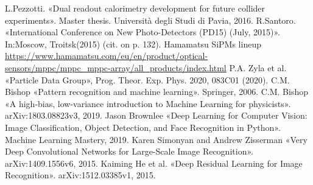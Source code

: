 \documentclass[a4paper,11pt,titlepage,oneside]{book}	%
\begin{document}
	\begin{backmatter}
		
		
		\begin{thebibliography}{99}
			
			
			 L.Pezzotti. «Dual readout calorimetry development for future collider experiments». Master thesis. Università degli Studi di Pavia, 2016.
			 R.Santoro. «International Conference on New Photo-Detectors (PD15) (July, 2015)». In:Moscow, Troitsk(2015) (cit. on p. 132).
			 Hamamatsu SiPMs lineup \url{https://www.hamamatsu.com/eu/en/product/optical-sensors/mppc/mppc_mppc-array/all_products/index.html}
			 P.A. Zyla et al. «Particle Data Group», Prog. Theor. Exp. Phys. 2020, 083C01 (2020). 
			 C.M. Bishop «Pattern recognition and machine learning». Springer, 2006. 
			 C.M. Bishop «A high-bias, low-variance introduction to Machine Learning for physicists». arXiv:1803.08823v3, 2019. 
			 Jason Brownlee «Deep Learning for Computer Vision: Image Classification, Object Detection, and Face Recognition in Python». Machine Learning Mastery, 2019.
			 Karen Simonyan and Andrew Zisserman «Very Deep Convolutional Networks for Large-Scale Image Recognition». arXiv:1409.1556v6, 2015.
			 Kaiming He et al. «Deep Residual Learning for Image Recognition». arXiv:1512.03385v1, 2015.
			
		\end{thebibliography}
		
	\end{backmatter}
	
	
\end{document}
